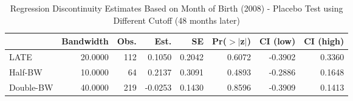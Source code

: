 \begin{table}[ht]
\centering
\begin{tabular}{lrrrrrrr}
  \hline
 & Bandwidth & Obs. & Est. & SE & Pr($>$$|$z$|$) & CI (low) & CI (high) \\ 
  \hline
LATE & 20.0000 & 112 & 0.1050 & 0.2042 & 0.6072 & -0.3902 & 0.3360 \\ 
  Half-BW & 10.0000 & 64 & 0.2137 & 0.3091 & 0.4893 & -0.2886 & 0.1648 \\ 
  Double-BW & 40.0000 & 219 & -0.0253 & 0.1430 & 0.8596 & -0.3909 & 0.1413 \\ 
   \hline
\end{tabular}
\caption{Regression Discontinuity Estimates Based on Month of Birth (2008) - Placebo Test using Different Cutoff (48 months later)} 
\label{tab:rd2008m_plac}
\end{table}
